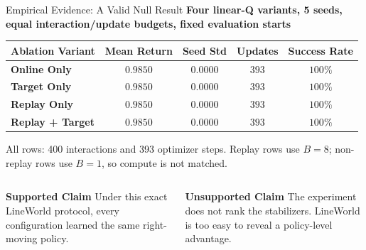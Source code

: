 \documentclass[aspectratio=169,10pt]{beamer}
\newcommand{\sectionlabel}[1]{%
  {\small\bfseries\color{islteal}#1}\par\vspace{0.14cm}%
}
\begin{document}
\begin{frame}{Empirical Evidence: A Valid Null Result}
  \sectionlabel{Four linear-Q variants, 5 seeds, equal interaction/update budgets, fixed evaluation starts}

  \renewcommand{\arraystretch}{1.20}
  \setlength{\tabcolsep}{6pt}
  {\centering
    \footnotesize
    \begin{tabular}{@{}lcccc@{}}
      \toprule
      \textbf{Ablation Variant} & \textbf{Mean Return} & \textbf{Seed Std} & \textbf{Updates} & \textbf{Success Rate} \\
      \midrule
      \textbf{Online Only} & $0.9850$ & $0.0000$ & $393$ & $100\%$ \\
      \textbf{Target Only} & $0.9850$ & $0.0000$ & $393$ & $100\%$ \\
      \textbf{Replay Only} & $0.9850$ & $0.0000$ & $393$ & $100\%$ \\
      \textbf{Replay + Target} & $0.9850$ & $0.0000$ & $393$ & $100\%$ \\
      \bottomrule
    \end{tabular}
  \par}

  \vspace{0.10cm}
  {\centering\scriptsize All rows: 400 interactions and 393 optimizer steps. Replay rows use $B=8$; non-replay rows use $B=1$, so compute is not matched.\par}

  \vspace{0.16cm}
  \begin{columns}[T,onlytextwidth]
      \begin{block}{\small\color{islgold}\textbf{Supported Claim}}
        \footnotesize Under this exact LineWorld protocol, every configuration learned the same right-moving policy.
      \end{block}
      \begin{block}{\small\color{islgreen}\textbf{Unsupported Claim}}
        \footnotesize The experiment does not rank the stabilizers. LineWorld is too easy to reveal a policy-level advantage.
      \end{block}
  \end{columns}
\end{frame}
\end{document}
